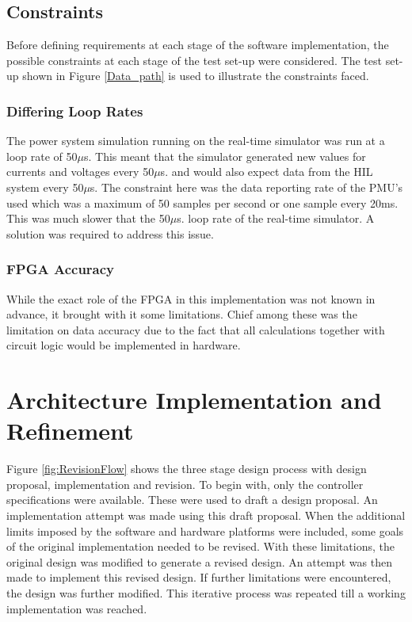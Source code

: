 \documentclass[conference]{IEEEtran}
\begin{document}
\subsection{Constraints}

Before defining requirements at each stage of the software implementation, the possible constraints at each stage of the test set-up were considered. The test set-up shown in Figure \ref{Data_path} is used to illustrate the constraints faced.

\subsubsection*{Differing Loop Rates}
The power system simulation running on the real-time simulator was run at a loop rate of 50$\mu$s. This meant that the simulator generated new values for currents and voltages every 50$\mu$s. and would also expect data from the HIL system every 50$\mu$s. The constraint here was the data reporting rate of the PMU's used which was a maximum of 50 samples per second or one sample every 20ms. This was much slower that the 50$\mu$s. loop rate of the real-time simulator. A solution was required to address this issue.

\subsubsection*{FPGA Accuracy}
While the exact role of the FPGA in this implementation was not known in advance, it brought with it some limitations. Chief among these was the limitation on data accuracy due to the fact that all calculations together with circuit logic would be implemented in hardware.

\section{Architecture Implementation and Refinement}

Figure \ref{fig:RevisionFlow} shows the three stage design process with design proposal, implementation and revision. To begin with, only the controller specifications were available. These were used to draft a design proposal. An implementation attempt was made using this draft proposal. When the additional limits imposed by the software and hardware platforms were included, some goals of the original implementation needed to be revised. With these limitations, the original design was modified to generate a revised design. An attempt was then made to implement this revised design. If further limitations were encountered, the design was further modified. This iterative process was repeated till a working implementation was reached.
\end{document}

